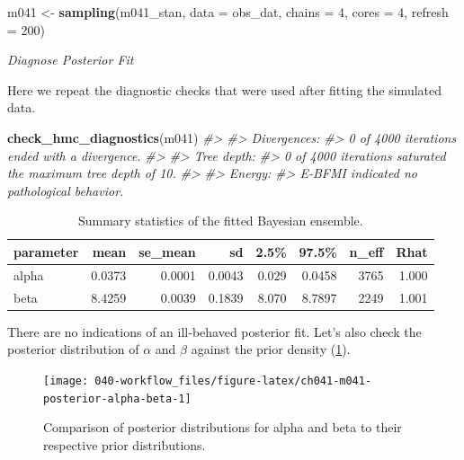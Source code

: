 \documentclass[11pt, oneside, openany]{scrbook}
\newenvironment{Shaded}{\begin{snugshade}}{\end{snugshade}}
\newcommand{\CommentTok}[1]{\textcolor[rgb]{0.56,0.35,0.01}{\textit{#1}}}
\newcommand{\DataTypeTok}[1]{\textcolor[rgb]{0.13,0.29,0.53}{#1}}
\newcommand{\DecValTok}[1]{\textcolor[rgb]{0.00,0.00,0.81}{#1}}
\newcommand{\KeywordTok}[1]{\textcolor[rgb]{0.13,0.29,0.53}{\textbf{#1}}}
\newcommand{\NormalTok}[1]{#1}
\newcommand{\StringTok}[1]{\textcolor[rgb]{0.31,0.60,0.02}{#1}}
\begin{document}
\begin{Shaded}
\begin{Highlighting}[]
\NormalTok{m041 <-}\StringTok{ }\KeywordTok{sampling}\NormalTok{(m041_stan, }\DataTypeTok{data =}\NormalTok{ obs_dat, }
                 \DataTypeTok{chains =} \DecValTok{4}\NormalTok{, }\DataTypeTok{cores =} \DecValTok{4}\NormalTok{, }\DataTypeTok{refresh =} \DecValTok{200}\NormalTok{)}
\end{Highlighting}
\end{Shaded}

\emph{Diagnose Posterior Fit}

Here we repeat the diagnostic checks that were used after fitting the simulated data.

\begin{Shaded}
\begin{Highlighting}[]
\KeywordTok{check_hmc_diagnostics}\NormalTok{(m041)}
\CommentTok{#> }
\CommentTok{#> Divergences:}
\CommentTok{#> 0 of 4000 iterations ended with a divergence.}
\CommentTok{#> }
\CommentTok{#> Tree depth:}
\CommentTok{#> 0 of 4000 iterations saturated the maximum tree depth of 10.}
\CommentTok{#> }
\CommentTok{#> Energy:}
\CommentTok{#> E-BFMI indicated no pathological behavior.}
\end{Highlighting}
\end{Shaded}

\begin{table}[!h]

\caption{\label{tab:ch041-Maroon-Oyster}Summary statistics of the fitted Bayesian ensemble.}
\centering
\begin{tabular}[t]{lrrrrrrr}
\toprule
parameter & mean & se\_mean & sd & 2.5\% & 97.5\% & n\_eff & Rhat\\
\midrule
alpha & 0.0373 & 0.0001 & 0.0043 & 0.029 & 0.0458 & 3765 & 1.000\\
beta & 8.4259 & 0.0039 & 0.1839 & 8.070 & 8.7897 & 2249 & 1.001\\
\bottomrule
\end{tabular}
\end{table}

There are no indications of an ill-behaved posterior fit. Let's also check the posterior distribution of \(\alpha\) and \(\beta\) against the prior density (\ref{fig:ch041-m041-posterior-alpha-beta}).

\begin{figure}

{\centering \texttt{[image: 040-workflow\_files/figure-latex/ch041-m041-posterior-alpha-beta-1]} 

}

\caption{Comparison of posterior distributions for alpha and beta to their respective prior distributions.}\label{fig:ch041-m041-posterior-alpha-beta}
\end{figure}
\end{document}
